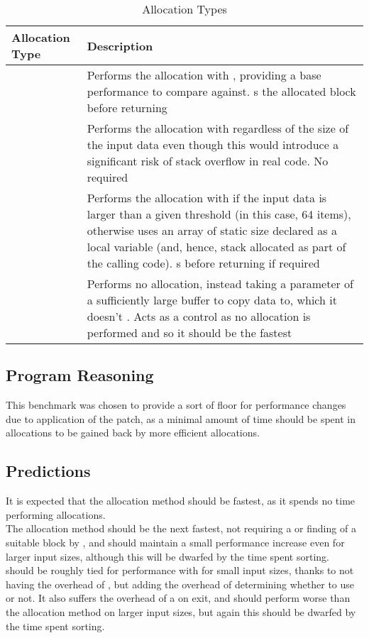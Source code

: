 \begin{table}
	\centering
	\begin{tabularx}{\linewidth}{>{\hsize=0.6\hsize}X >{\hsize=1.4\hsize}X}
		\toprule
		\textbf{Allocation Type} & \textbf{Description} \\
		\midrule
		\functionname{malloc} & Performs the allocation with \malloc{}, providing a base performance to compare against. \free{}s the allocated block before returning \\
		\functionname{stack} & Performs the allocation with \functionname{alloca} regardless of the size of the input data even though this would introduce a significant risk of stack overflow in real code. No \free{} required \\
		\functionname{dynamic} & Performs the allocation with \malloc{} if the input data is larger than a given threshold (in this case, 64 items), otherwise uses an array of static size declared as a local variable (and, hence, stack allocated as part of the calling code). \free{}s before returning if required \\
		\functionname{external} & Performs no allocation, instead taking a parameter of a sufficiently large buffer to copy data to, which it doesn't \free{}. Acts as a control as no allocation is performed and so it should be the fastest \\
		\bottomrule
	\end{tabularx}
	\caption{Allocation Types}\label{alloctype}
\end{table}

\subsection{Program Reasoning}

This benchmark was chosen to provide a sort of floor for performance changes due to application of the patch, as a minimal amount of time should be spent in allocations to be gained back by more efficient allocations.

\subsection{Predictions}

It is expected that the  allocation method should be fastest, as it spends no time performing allocations. \\
The  allocation method should be the next fastest, not requiring a \free{} or finding of a suitable block by \malloc{}, and should maintain a small performance increase even for larger input sizes, although this will be dwarfed by the time spent sorting. \\
 should be roughly tied for performance with  for small input sizes, thanks to not having the overhead of , but adding the overhead of determining whether to use \malloc{} or not. It also suffers the overhead of a \free{} on exit, and should perform worse than the  allocation method on larger input sizes, but again this should be dwarfed by the time spent sorting.

